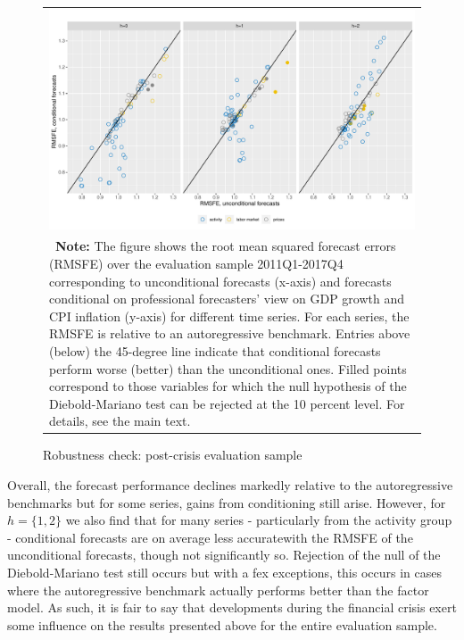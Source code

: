 \documentclass[notitlepage,a4paper,12pt]{article}
\begin{document}
\begin{figure}[htbp] \centering
    \caption{Robustness check: post-crisis evaluation sample \label{fig:postcrisis}}
    \footnotesize
    \begin{tabular}{p{16cm}}
        \multicolumn{1}{c}{\includegraphics*[scale = 0.6]{../figures/fig_eval_postcrisis.pdf}} \\
        {
        \footnotesize \textbf{Note:} The figure shows the root mean squared forecast errors (RMSFE) over the evaluation sample 2011Q1-2017Q4 corresponding to unconditional forecasts (x-axis) and forecasts conditional on professional forecasters' view on GDP growth and CPI inflation (y-axis) for different time series. For each series, the RMSFE is relative to an autoregressive benchmark. Entries above (below) the 45-degree line indicate that conditional forecasts perform worse (better) than the unconditional ones. Filled points correspond to those variables for which the null hypothesis of the Diebold-Mariano test can be rejected at the 10 percent level. For details, see the main text. 
        }
        \end{tabular}
    \newline
    \normalsize
\end{figure}

Overall, the forecast performance declines markedly relative to the autoregressive benchmarks but for some series, gains from conditioning still arise. However, for $h=\{1,2\}$ we also find that for many series - particularly from the activity group - conditional forecasts are on average less accuratewith the RMSFE of the unconditional forecasts, though not significantly so. Rejection of the null of the Diebold-Mariano test still occurs but with a fex exceptions, this occurs in cases where the autoregressive benchmark actually performs better than the factor model. As such, it is fair to say that developments during the financial crisis exert some influence on the results presented above for the entire evaluation sample.
\end{document}
